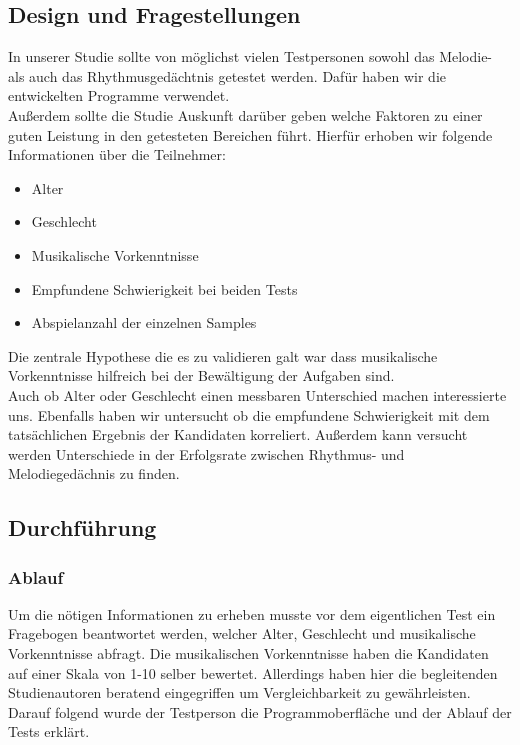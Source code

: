 \documentclass{acm_proc_article-sp}
\begin{document}
\subsection{Design und Fragestellungen}
In unserer Studie sollte von möglichst vielen Testpersonen sowohl das Melodie- als auch das Rhythmusgedächtnis getestet werden. Dafür haben wir die entwickelten Programme verwendet.\\
Außerdem sollte die Studie Auskunft darüber geben welche Faktoren zu einer guten Leistung in den getesteten Bereichen führt. Hierfür erhoben wir folgende Informationen über die Teilnehmer:\\
\begin{itemize} 
\item Alter
\item Geschlecht
\item Musikalische Vorkenntnisse
\item Empfundene Schwierigkeit bei beiden Tests
\item Abspielanzahl der einzelnen Samples
\end{itemize}
Die zentrale Hypothese die es zu validieren galt war dass musikalische Vorkenntnisse hilfreich bei der Bewältigung der Aufgaben sind. \\
Auch ob Alter oder Geschlecht einen messbaren Unterschied machen interessierte uns. Ebenfalls haben wir untersucht ob die empfundene Schwierigkeit mit dem tatsächlichen Ergebnis der Kandidaten korreliert. 
Außerdem kann versucht werden Unterschiede in der Erfolgsrate zwischen Rhythmus- und Melodiegedächnis zu finden. 
\subsection{Durchführung}

\subsubsection{Ablauf}
Um die nötigen Informationen zu erheben musste vor dem eigentlichen Test ein Fragebogen beantwortet werden, welcher Alter, Geschlecht und musikalische Vorkenntnisse abfragt. Die musikalischen Vorkenntnisse haben die Kandidaten auf einer Skala von 1-10 selber bewertet. Allerdings haben hier die begleitenden Studienautoren beratend eingegriffen um Vergleichbarkeit zu gewährleisten.\\
Darauf folgend wurde der Testperson die Programmoberfläche und der Ablauf der Tests erklärt.\\ 
\end{document}
